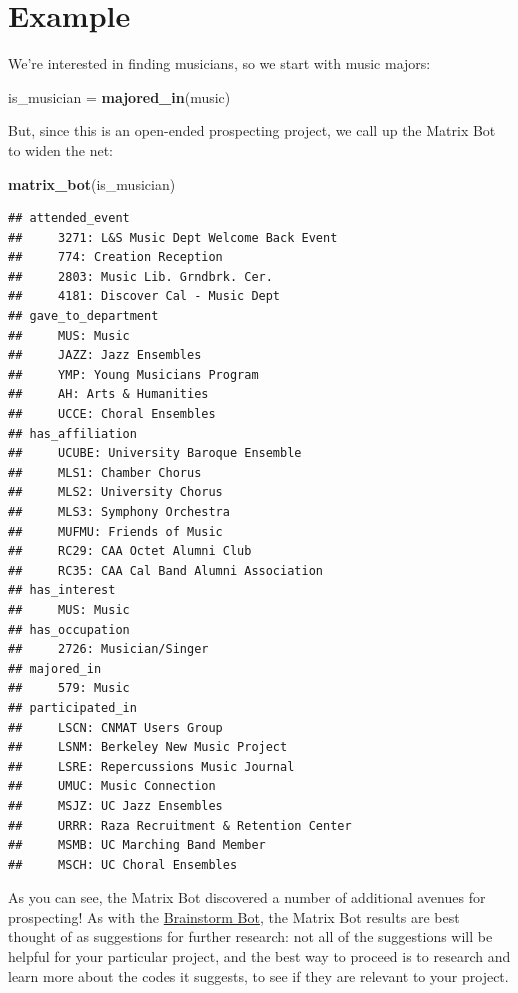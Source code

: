\documentclass[]{book}
\newenvironment{Shaded}{\begin{snugshade}}{\end{snugshade}}
\newcommand{\KeywordTok}[1]{\textcolor[rgb]{0.13,0.29,0.53}{\textbf{#1}}}
\newcommand{\NormalTok}[1]{#1}
\newcommand{\StringTok}[1]{\textcolor[rgb]{0.31,0.60,0.02}{#1}}
\begin{document}
\hypertarget{example-1}{%
\section{Example}\label{example-1}}

We're interested in finding musicians, so we start with music majors:

\begin{Shaded}
\begin{Highlighting}[]
\NormalTok{is_musician =}\StringTok{ }\KeywordTok{majored_in}\NormalTok{(music)}
\end{Highlighting}
\end{Shaded}

But, since this is an open-ended prospecting project, we call up the Matrix Bot to widen the net:

\begin{Shaded}
\begin{Highlighting}[]
\KeywordTok{matrix_bot}\NormalTok{(is_musician)}
\end{Highlighting}
\end{Shaded}

\begin{verbatim}
## attended_event 
##     3271: L&S Music Dept Welcome Back Event
##     774: Creation Reception
##     2803: Music Lib. Grndbrk. Cer.
##     4181: Discover Cal - Music Dept
## gave_to_department 
##     MUS: Music
##     JAZZ: Jazz Ensembles
##     YMP: Young Musicians Program
##     AH: Arts & Humanities
##     UCCE: Choral Ensembles
## has_affiliation 
##     UCUBE: University Baroque Ensemble
##     MLS1: Chamber Chorus
##     MLS2: University Chorus
##     MLS3: Symphony Orchestra
##     MUFMU: Friends of Music
##     RC29: CAA Octet Alumni Club
##     RC35: CAA Cal Band Alumni Association
## has_interest 
##     MUS: Music
## has_occupation 
##     2726: Musician/Singer
## majored_in 
##     579: Music
## participated_in 
##     LSCN: CNMAT Users Group
##     LSNM: Berkeley New Music Project
##     LSRE: Repercussions Music Journal
##     UMUC: Music Connection
##     MSJZ: UC Jazz Ensembles
##     URRR: Raza Recruitment & Retention Center
##     MSMB: UC Marching Band Member
##     MSCH: UC Choral Ensembles
\end{verbatim}

As you can see, the Matrix Bot discovered a number of additional avenues for prospecting! As with the \protect\hyperlink{brainstorm-bot}{Brainstorm Bot}, the Matrix Bot results are best thought of as suggestions for further research: not all of the suggestions will be helpful for your particular project, and the best way to proceed is to research and learn more about the codes it suggests, to see if they are relevant to your project.
\end{document}
